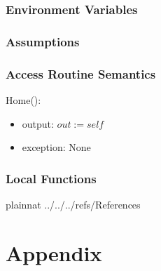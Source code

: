 \documentclass[12pt, titlepage]{article}
\begin{document}
\subsubsection{Environment Variables}


\subsubsection{Assumptions}


\subsubsection{Access Routine Semantics}

\noindent Home():
\begin{itemize}
	\item output: $out := self$ 
	\item exception: None
\end{itemize}




\subsubsection{Local Functions}



\newpage

 {plainnat}
 {../../../refs/References}

\newpage

\section{Appendix} \label{Appendix}

\end{document}
